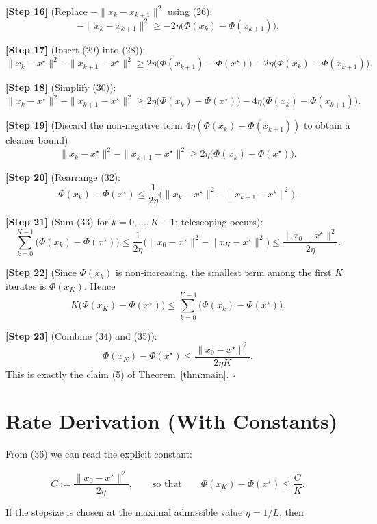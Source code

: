 \documentclass{article}
\begin{document}
\noindent\textbf{[Step 16]} (Replace $-\|x_{k}-x_{k+1}\|^{2}$ using (26):
\[
-\|x_{k}-x_{k+1}\|^{2}
\ge -2\eta\bigl(\Phi(x_{k})-\Phi(x_{k+1})\bigr).
\tag{29}
\]

\noindent\textbf{[Step 17]} (Insert (29) into (28)):
\[
\|x_{k}-x^{\star}\|^{2}
-\|x_{k+1}-x^{\star}\|^{2}
\ge 2\eta\bigl(\Phi(x_{k+1})-\Phi(x^{\star})\bigr)
-2\eta\bigl(\Phi(x_{k})-\Phi(x_{k+1})\bigr).
\tag{30}
\]

\noindent\textbf{[Step 18]} (Simplify (30)):
\[
\|x_{k}-x^{\star}\|^{2}
-\|x_{k+1}-x^{\star}\|^{2}
\ge 2\eta\bigl(\Phi(x_{k})-\Phi(x^{\star})\bigr)
-4\eta\bigl(\Phi(x_{k})-\Phi(x_{k+1})\bigr).
\tag{31}
\]

\noindent\textbf{[Step 19]} (Discard the non‑negative term $4\eta(\Phi(x_{k})-\Phi(x_{k+1}))$ to obtain a cleaner bound)
\[
\|x_{k}-x^{\star}\|^{2}
-\|x_{k+1}-x^{\star}\|^{2}
\ge 2\eta\bigl(\Phi(x_{k})-\Phi(x^{\star})\bigr).
\tag{32}
\]

\noindent\textbf{[Step 20]} (Rearrange (32):
\[
\Phi(x_{k})-\Phi(x^{\star})
\le \frac{1}{2\eta}\bigl(\|x_{k}-x^{\star}\|^{2}
-\|x_{k+1}-x^{\star}\|^{2}\bigr).
\tag{33}
\]

\noindent\textbf{[Step 21]} (Sum (33) for $k=0,\dots,K-1$; telescoping occurs):
\[
\sum_{k=0}^{K-1}\bigl(\Phi(x_{k})-\Phi(x^{\star})\bigr)
\le \frac{1}{2\eta}\bigl(\|x_{0}-x^{\star}\|^{2}
-\|x_{K}-x^{\star}\|^{2}\bigr)
\le \frac{\|x_{0}-x^{\star}\|^{2}}{2\eta}.
\tag{34}
\]

\noindent\textbf{[Step 22]} (Since $\Phi(x_{k})$ is non‑increasing, the smallest term among the first $K$ iterates is $\Phi(x_{K})$. Hence
\[
K\bigl(\Phi(x_{K})-\Phi(x^{\star})\bigr)
\le \sum_{k=0}^{K-1}\bigl(\Phi(x_{k})-\Phi(x^{\star})\bigr).
\tag{35}
\]

\noindent\textbf{[Step 23]} (Combine (34) and (35)):
\[
\Phi(x_{K})-\Phi(x^{\star})
\le \frac{\|x_{0}-x^{\star}\|^{2}}{2\eta K}.
\tag{36}
\]
This is exactly the claim (5) of Theorem~\ref{thm:main}. $\square$

\section*{Rate Derivation (With Constants)}
From (36) we can read the explicit constant:  

\[
C:=\frac{\|x_{0}-x^{\star}\|^{2}}{2\eta},
\qquad\text{so that}\qquad
\Phi(x_{K})-\Phi(x^{\star})\le \frac{C}{K}.
\]

If the stepsize is chosen at the maximal admissible value $\eta=1/L$, then  
\end{document}
